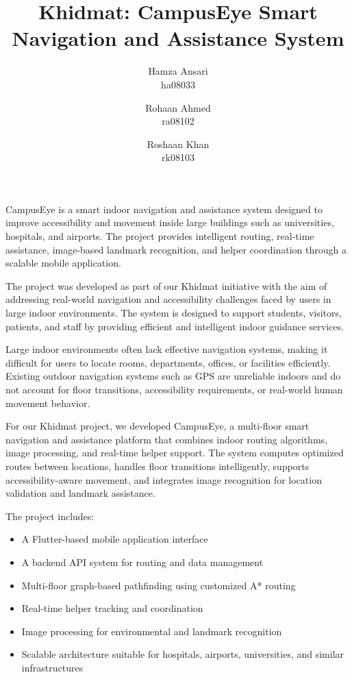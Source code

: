 \documentclass{article}
\title{Khidmat: CampusEye Smart Navigation and Assistance System}
\author{
  Hamza Ansari\\ ha08033
  \and
  Rohaan Ahmed\\ ra08102
  \and
  Roshaan Khan\\ rk08103
}
\date{}
\begin{document}
\maketitle


CampusEye is a smart indoor navigation and assistance system designed to improve accessibility and movement inside large buildings such as universities, hospitals, and airports. The project provides intelligent routing, real-time assistance, image-based landmark recognition, and helper coordination through a scalable mobile application.

The project was developed as part of our Khidmat initiative with the aim of addressing real-world navigation and accessibility challenges faced by users in large indoor environments. The system is designed to support students, visitors, patients, and staff by providing efficient and intelligent indoor guidance services.

Large indoor environments often lack effective navigation systems, making it difficult for users to locate rooms, departments, offices, or facilities efficiently. Existing outdoor navigation systems such as GPS are unreliable indoors and do not account for floor transitions, accessibility requirements, or real-world human movement behavior.

For our Khidmat project, we developed CampusEye, a multi-floor smart navigation and assistance platform that combines indoor routing algorithms, image processing, and real-time helper support. The system computes optimized routes between locations, handles floor transitions intelligently, supports accessibility-aware movement, and integrates image recognition for location validation and landmark assistance.

The project includes:
\begin{itemize}
    \item A Flutter-based mobile application interface
    \item A backend API system for routing and data management
    \item Multi-floor graph-based pathfinding using customized A* routing
    \item Real-time helper tracking and coordination
    \item Image processing for environmental and landmark recognition
    \item Scalable architecture suitable for hospitals, airports, universities, and similar infrastructures
\end{itemize}
\end{document}
